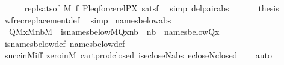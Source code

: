 \begin{isabellebody}
\ \ \ \ \isamarkupfalse%
\ repl{\isacharunderscore}{\kern0pt}sats{\isacharbrackleft}{\kern0pt}of\ M\ {\isacharquery}{\kern0pt}f\ {\isachardoublequoteopen}{\isacharbrackleft}{\kern0pt}P{\isacharcomma}{\kern0pt}leq{\isacharcomma}{\kern0pt}forcerel{\isacharparenleft}{\kern0pt}P{\isacharcomma}{\kern0pt}X{\isacharparenright}{\kern0pt}{\isacharbrackright}{\kern0pt}{\isachardoublequoteclose}{\isacharbrackright}{\kern0pt}\ satsf\ \isamarkupfalse%
\ {\isacharparenleft}{\kern0pt}simp\ del{\isacharcolon}{\kern0pt}pair{\isacharunderscore}{\kern0pt}abs{\isacharparenright}{\kern0pt}\isanewline
\ \ \isamarkupfalse%
\isanewline
\ \ \isamarkupfalse%
\ {\isacharquery}{\kern0pt}thesis\ \isamarkupfalse%
\ wfrec{\isacharunderscore}{\kern0pt}replacement{\isacharunderscore}{\kern0pt}def\ \isamarkupfalse%
\ simp\isanewline
{}\isamarkupfalse%
%
\endisatagproof
{\isafoldproof}%
%
\isadelimproof
\isanewline
%
\endisadelimproof
\isanewline
{}\isamarkupfalse%
\ names{\isacharunderscore}{\kern0pt}below{\isacharunderscore}{\kern0pt}abs\ {\isacharcolon}{\kern0pt}\isanewline
\ \ {\isachardoublequoteopen}{\isasymlbrakk}Q{\isasymin}M{\isacharsemicolon}{\kern0pt}x{\isasymin}M{\isacharsemicolon}{\kern0pt}nb{\isasymin}M{\isasymrbrakk}\ {\isasymLongrightarrow}\ is{\isacharunderscore}{\kern0pt}names{\isacharunderscore}{\kern0pt}below{\isacharparenleft}{\kern0pt}{\isacharhash}{\kern0pt}{\isacharhash}{\kern0pt}M{\isacharcomma}{\kern0pt}Q{\isacharcomma}{\kern0pt}x{\isacharcomma}{\kern0pt}nb{\isacharparenright}{\kern0pt}\ {\isasymlongleftrightarrow}\ nb\ {\isacharequal}{\kern0pt}\ names{\isacharunderscore}{\kern0pt}below{\isacharparenleft}{\kern0pt}Q{\isacharcomma}{\kern0pt}x{\isacharparenright}{\kern0pt}{\isachardoublequoteclose}\isanewline
%
\isadelimproof
\ \ %
\endisadelimproof
%
\isatagproof
{}\isamarkupfalse%
\ is{\isacharunderscore}{\kern0pt}names{\isacharunderscore}{\kern0pt}below{\isacharunderscore}{\kern0pt}def\ names{\isacharunderscore}{\kern0pt}below{\isacharunderscore}{\kern0pt}def\isanewline
\ \ \isamarkupfalse%
\ succ{\isacharunderscore}{\kern0pt}in{\isacharunderscore}{\kern0pt}M{\isacharunderscore}{\kern0pt}iff\ zero{\isacharunderscore}{\kern0pt}in{\isacharunderscore}{\kern0pt}M\ cartprod{\isacharunderscore}{\kern0pt}closed\ is{\isacharunderscore}{\kern0pt}ecloseN{\isacharunderscore}{\kern0pt}abs\ ecloseN{\isacharunderscore}{\kern0pt}closed\isanewline
\ \ \isamarkupfalse%
\ auto%
\endisatagproof
{\isafoldproof}%

\end{isabellebody}
